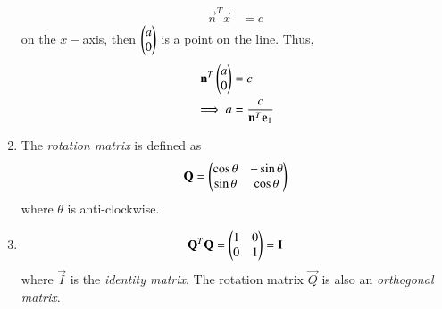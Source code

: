 \begin{enumerate}[label=\arabic*.,ref=\thesubsection.\theenumi]
\begin{align}
\label{eq:line_intercept}
\vec{n}^T\vec{x} &=c
\end{align}
on the $x-$axis, then $\begin{pmatrix}a\\0\end{pmatrix}$  is a point on the line.  Thus, 
\begin{align}
\label{eq:line_intercept}
\mathbf{n}^T\begin{pmatrix}a\\0\end{pmatrix} &=c
\\
\implies a &= \frac{c}{\mathbf{n}^T\mathbf{e}_1}
\end{align}
%
\renewcommand{\theequation}{\theenumi}
%
\item The {\em rotation matrix} is defined as
\begin{align}
\mathbf{Q} = \begin{pmatrix}\cos \theta & -\sin \theta\\ \sin \theta & \cos \theta\end{pmatrix}
\end{align}
%
where $\theta$ is anti-clockwise.
\item 
\begin{align}
\mathbf{Q}^T\mathbf{Q} = \begin{pmatrix}1 & 0 \\ 0 & 1\end{pmatrix} = \mathbf{I}
\end{align}
%
where $\vec{I}$ is the {\em identity matrix}. The rotation matrix $\vec{Q}$ is also an {\em orthogonal matrix}.


\end{enumerate}
